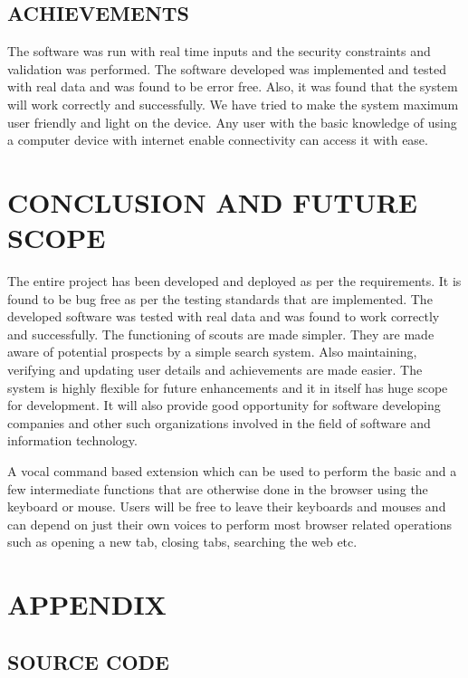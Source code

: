 \documentclass[12pt]{report} %
\begin{document}
\section{ACHIEVEMENTS}
\label{sec:ACHIEVEMENTS}
The software was run with real time inputs and the security constraints and validation was performed.
The software developed was implemented and tested with real data and was found to be error free. Also, it was found that the system will work correctly and successfully. We have tried to make the system maximum user friendly and light on the device. Any user with the basic knowledge of using a computer device with internet enable connectivity can access it with ease.

\chapter{CONCLUSION AND FUTURE SCOPE}
The entire project has been developed and deployed as per the requirements. It is found to be bug free as per the testing standards that are implemented. The developed software was tested with real data and was found to work correctly and successfully. 
The functioning of scouts are made simpler. They are made aware of potential prospects by a simple search system. Also maintaining, verifying and updating user details and achievements are made easier. The system is highly flexible for future enhancements and it in itself has huge scope for development. It will also provide good opportunity for software developing companies and other such organizations involved in the field of software and information technology.

A vocal command based extension which can be used to perform the basic and a few intermediate functions that are otherwise done in the browser using the keyboard or mouse.
Users will be free to leave their keyboards and mouses and can depend on just their own voices to perform most browser related operations such as opening a new tab, closing tabs, searching the web etc. 


\nocite{HTTPWikipedia}
\nocite{javahttpsessionStackoverflow}



\chapter{APPENDIX}

\section{SOURCE CODE}
\label{sec:SOURCE CODE}
\end{document}
